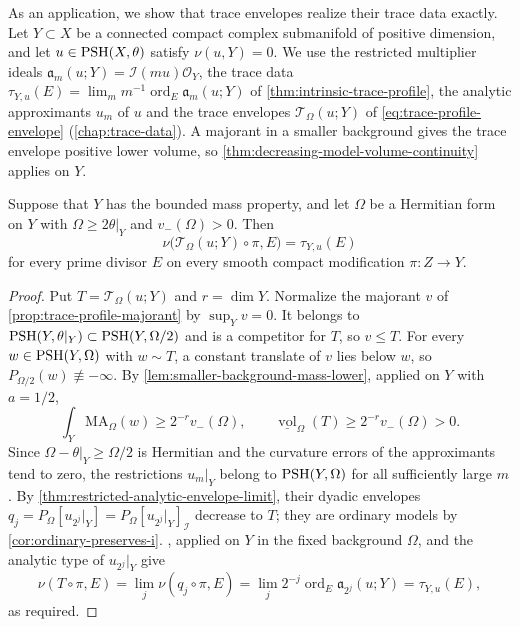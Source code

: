 As an application, we show that trace envelopes realize their trace data exactly. Let $Y\subset X$ be a connected compact complex submanifold of positive dimension, and let $u\in\mathrm{PSH}(X,\theta)$ satisfy $\nu(u,Y)=0$. We use the restricted multiplier ideals $\mathfrak a_m(u;Y)=\mathcal I(mu)\mathcal O_Y$, the trace data $\tau_{Y,u}(E)=\lim_mm^{-1}\operatorname{ord}_E\mathfrak a_m(u;Y)$ of \cref{thm:intrinsic-trace-profile}, the analytic approximants $u_m$ of $u$ and the trace envelopes $\mathcal T_\Omega(u;Y)$ of \eqref{eq:trace-profile-envelope} (\cref{chap:trace-data}). A majorant in a smaller background gives the trace envelope positive lower volume, so \cref{thm:decreasing-model-volume-continuity} applies on $Y$.

\begin{corollary}\label{cor:mass-bound-exact-trace}
Suppose that $Y$ has the bounded mass property, and let $\Omega$ be a Hermitian form on $Y$ with $\Omega\geq2\theta|_Y$ and $v_-(\Omega)>0$. Then
\[
 \nu\bigl(\mathcal T_\Omega(u;Y)\circ\pi,E\bigr)=\tau_{Y,u}(E)
\]
for every prime divisor $E$ on every smooth compact modification $\pi\colon Z\to Y$.
\end{corollary}
\begin{proof}
Put $T=\mathcal T_\Omega(u;Y)$ and $r=\dim Y$. Normalize the majorant $v$ of \cref{prop:trace-profile-majorant} by $\sup_Yv=0$. It belongs to $\mathrm{PSH}(Y,\theta|_Y)\subset\mathrm{PSH}(Y,\Omega/2)$ and is a competitor for $T$, so $v\leq T$. For every $w\in\mathrm{PSH}(Y,\Omega)$ with $w\sim T$, a constant translate of $v$ lies below $w$, so $P_{\Omega/2}(w)\not\equiv-\infty$. By \cref{lem:smaller-background-mass-lower}, applied on $Y$ with $a=1/2$,
\[
 \int_Y\mathrm{MA}_\Omega(w)\geq2^{-r}v_-(\Omega),
 \qquad
 \underline{\operatorname{vol}}_\Omega(T)
       \geq2^{-r}v_-(\Omega)>0.
\]
Since $\Omega-\theta|_Y\geq\Omega/2$ is Hermitian and the curvature errors of the approximants tend to zero, the restrictions $u_m|_Y$ belong to $\mathrm{PSH}(Y,\Omega)$ for all sufficiently large $m$. By \cref{thm:restricted-analytic-envelope-limit}, their dyadic envelopes $q_j=P_\Omega[u_{2^j}|_Y]=P_\Omega[u_{2^j}|_Y]_{\mathcal I}$ decrease to $T$; they are ordinary models by \cref{cor:ordinary-preserves-i}. , applied on $Y$ in the fixed background $\Omega$, and the analytic type of $u_{2^j}|_Y$ give
\[
 \nu(T\circ\pi,E)
 =\lim_j\nu(q_j\circ\pi,E)
 =\lim_j2^{-j}\operatorname{ord}_E\mathfrak a_{2^j}(u;Y)
 =\tau_{Y,u}(E),
\]
as required.
\end{proof}

